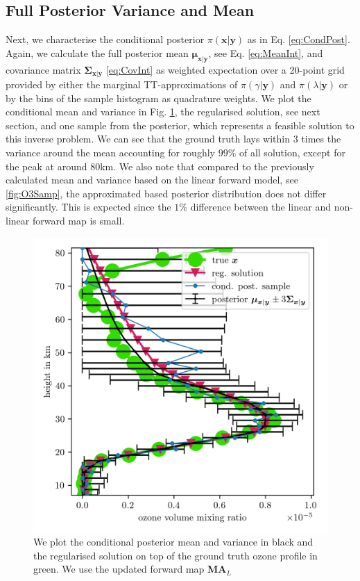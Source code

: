 \subsection{Full Posterior Variance and Mean}
Next, we characterise the conditional posterior $\pi(\bm{x}|\bm{y})$ as in Eq. \ref{eq:CondPost}. 
Again, we calculate the full posterior mean $\bm{\mu}_{\bm{x}|\bm{y}}$, see Eq. \ref{eq:MeanInt}, and covariance matrix $\bm{\Sigma}_{ \bm{x}|\bm{y}}$ \ref{eq:CovInt} as weighted expectation over a 20-point grid provided by either the marginal TT-approximations of $\pi(\gamma| \bm{y})$ and $\pi(\lambda| \bm{y})$ or by the bins of the sample histogram as quadrature weights.
We plot the conditional mean and variance in Fig. \ref{fig:O3SolplsReg}, the regularised solution, see next section, and one sample from the posterior, which represents a feasible solution to this inverse problem.
We can see that the ground truth lays within 3 times the variance around the mean accounting for roughly $99 \%$ of all solution, except for the peak at around $80$km.
We also note that compared to the previously calculated mean and variance based on the linear forward model, see \ref{fig:O3Samp}, the approximated based posterior distribution does not differ significantly.
This is expected since the $1\%$ difference between the linear and non-linear forward map is small.
\begin{figure}[ht!]
	\centering
	\includegraphics{SecRecResinclRegandSampl.png}
	\caption[Ozone posterior mean and variance and the regularised solution compared to the ground truth.]{We plot the conditional posterior mean and variance in black and the regularised solution on top of the ground truth ozone profile in green. We use the updated forward map $\bm{M}\bm{A}_L$}
	\label{fig:O3SolplsReg}
\end{figure}

